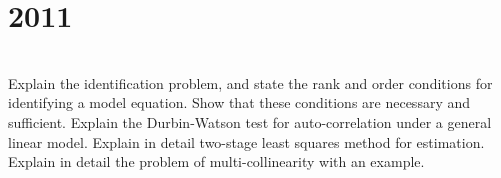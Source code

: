 \section*{2011}
\vspace{-.5cm}
\hrulefill \smallskip\\
 Explain the identification problem, and state the rank and order conditions for identifying a model equation. Show that these conditions are necessary and sufficient.
\myline
{} Explain the Durbin-Watson test for auto-correlation under a general linear model.
\myline
{} Explain in detail two-stage least squares method for estimation.
\myline
{} Explain in detail the problem of multi-collinearity with an example.
